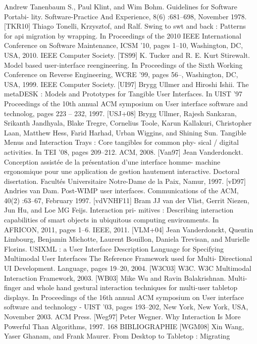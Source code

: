 \documentclass{article}
\begin{document}
Andrew Tanenbaum S., Paul Klint, and Wim Bohm. Guidelines for Software Portabi-
lity. Software-Practice And Experience, 8(6) :681–698, November 1978.
[TKR10]
Thiago Tonelli, Krzysztof, and Ralf. Swing to swt and back : Patterns for api migration
by wrapping. In Proceedings of the 2010 IEEE International Conference on Software
Maintenance, ICSM ’10, pages 1–10, Washington, DC, USA, 2010. IEEE Computer
Society.
[TS99]
K. Tucker and R. E. Kurt Stirewalt. Model based user-interface reengineering.
In
Proceedings of the Sixth Working Conference on Reverse Engineering, WCRE ’99,
pages 56–, Washington, DC, USA, 1999. IEEE Computer Society.
[UI97]
Brygg Ullmer and Hiroshi Ishii. The metaDESK : Models and Prototypes for Tangible
User Interfaces. In UIST ’97 Proceedings of the 10th annual ACM symposium on User
interface software and technolog, pages 223 – 232, 1997.
[USJ+08]
Brygg Ullmer, Rajesh Sankaran, Srikanth Jandhyala, Blake Tregre, Cornelius Toole,
Karun Kallakuri, Christopher Laan, Matthew Hess, Farid Harhad, Urban Wiggins, and
Shining Sun. Tangible Menus and Interaction Trays : Core tangibles for common phy-
sical / digital activities. In TEI ’08, pages 209–212. ACM, 2008.
[Van97]
Jean Vanderdonckt. Conception assistée de la présentation d’une interface homme-
machine ergonomique pour une application de gestion hautement interactive. Doctoral
disertation. Facultés Universitaire Notre-Dame de la Paix, Namur, 1997.
[vD97]
Andries van Dam.
Post-WIMP user interfaces.
Communications of the ACM,
40(2) :63–67, February 1997.
[vdVNHF11] Bram JJ van der Vlist, Gerrit Niezen, Jun Hu, and Loe MG Feijs. Interaction pri-
mitives : Describing interaction capabilities of smart objects in ubiquitous computing
environments. In AFRICON, 2011, pages 1–6. IEEE, 2011.
[VLM+04]
Jean Vanderdonckt, Quentin Limbourg, Benjamin Michotte, Laurent Bouillon, Daniela
Trevisan, and Murielle Florins.
USIXML : a User Interface Description Language
for Specifying Multimodal User Interfaces The Reference Framework used for Multi-
Directional UI Development. Language, pages 19–20, 2004.
[W3C03]
W3C. W3C Multimodal Interaction Framework, 2003.
[WB03]
Mike Wu and Ravin Balakrishnan. Multi-ﬁnger and whole hand gestural interaction
techniques for multi-user tabletop displays. In Proceedings of the 16th annual ACM
symposium on User interface software and technology - UIST ’03, pages 193–202, New
York, New York, USA, November 2003. ACM Press.
[Weg97]
Peter Wegner. Why Interaction Is More Powerful Than Algorithms, 1997.
168
BIBLIOGRAPHIE
[WGM08]
Xin Wang, Yaser Ghanam, and Frank Maurer. From Desktop to Tabletop : Migrating
\end{document}
